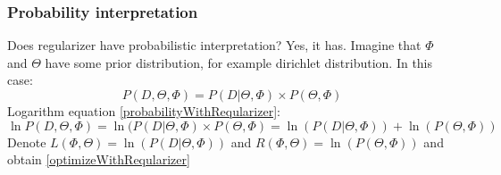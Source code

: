 	\subsubsection{Probability interpretation}
	    Does regularizer have probabilistic interpretation? Yes, it has. Imagine that $\Phi$ and $\Theta$ have some prior distribution, for example
	    dirichlet distribution. In this case:
	    \begin{equation} \label{probabilityWithReqularizer} P(D, \Theta, \Phi) = P(D| \Theta, \Phi) \times P(\Theta, \Phi) \end{equation}
	    Logarithm equation \ref{probabilityWithReqularizer}:
	    \begin{equation} \ln P(D, \Theta, \Phi) = \ln(P(D| \Theta, \Phi) \times P(\Theta, \Phi) = \ln(P(D| \Theta, \Phi)) + \ln(P(\Theta, \Phi)) \end{equation}
	    Denote $L(\Phi, \Theta) = \ln(P(D| \Theta, \Phi))$ and $R(\Phi, \Theta) = \ln(P(\Theta, \Phi))$ and obtain \ref{optimizeWithReqularizer}

